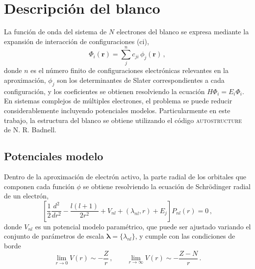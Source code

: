 \section{Descripción del blanco}
\label{sec:target-rmatrix}

La función de onda del sistema de $N$ electrones del blanco se expresa 
mediante la expansión de interacción de configuraciones (\acs{ci}),
\begin{equation*}
\Phi_i(\mathbf{r})=\sum_j^{n} c_{ji} \, \phi_j(\mathbf{r})\,,
\label{eq:phi-RM}
\end{equation*}
donde $n$ es el número finito de configuraciones electrónicas relevantes 
en la aproximación, $\phi_j$ son los determinantes de Slater 
correspondientes a cada configuración, y los coeficientes se obtienen 
resolviendo la ecuación $H\Phi_i=E_i\Phi_i$. En sistemas complejos de 
múltiples electrones, el problema se puede reducir considerablemente 
incluyendo potenciales modelos. 
Particularmente en este trabajo, la estructura del blanco se obtiene
utilizando el código \textsc{autostructure}~\cite{Badnell:11} de 
N. R. Badnell. 

\subsection{Potenciales modelo}
\label{subsec:potmod-rmatrix}

Dentro de la aproximación de electrón activo, la parte radial de los 
orbitales que componen cada función $\phi$ se obtiene resolviendo la 
ecuación de Schr\"odinger radial de un electrón,
\begin{equation*}
\left[ \frac{1}{2} \frac{d^2}{dr^2} - \frac{l(l+1)}{2r^2} 
 + V_{nl}+(\lambda_{nl},r) + E_j \right] P_{nl}(r)=0\,,
\label{eq:Schro-potmod}
\end{equation*}
donde $V_{nl}$ es un potencial modelo paramétrico, que puede ser 
ajustado variando el conjunto de parámetros de escala 
$\boldsymbol\lambda=\{\lambda_{nl}\}$, y cumple con las condiciones de 
borde
\begin{equation}
\lim_{r \rightarrow 0} V(r) \sim -\frac{Z}{r} \,,\qquad
\lim_{r \rightarrow \infty} V(r) \sim -\frac{Z-N}{r} \,.
\end{equation}

